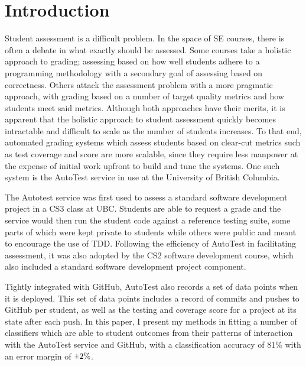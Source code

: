 \documentclass[sigchi]{acmart}
\newcommand{\rpm}{\sbox0{$1$}\sbox2{$\scriptstyle\pm$}
  \raise\dimexpr(\ht0-\ht2)/2\relax\box2 }
\begin{document}
\maketitle

\section{Introduction}
Student assessment is a difficult problem. In the space of SE courses, there is often a debate in what exactly should be assessed. Some courses take a holistic approach to grading; assessing based on how well students adhere to a programming methodology \cite{Felleisen:2001:DPI:369273} with a secondary goal of assessing based on correctness. Others attack the assessment problem with a more pragmatic approach, with grading based on a number of target quality metrics and how students meet said metrics. Although both approaches have their merits, it is apparent that the holistic approach to student assessment quickly becomes intractable and difficult to scale as the number of students increases. To that end, automated grading systems which assess students based on clear-cut metrics such as test coverage and score are more scalable, since they require less manpower at the expense of initial work upfront to build and tune the systems. One such system is the AutoTest\cite{AutoTest} service in use at the University of British Columbia.
\par The Autotest service was first used to assess a standard software development project in a CS3 class at UBC. Students are able to request a grade and the service would then run the student code against a reference testing suite, some parts of which were kept private to students while others were public and meant to encourage the use of TDD. Following the efficiency of AutoTest in facilitating assessment, it was also adopted by the CS2 software development course, which also included a standard software development project component.
\par Tightly integrated with GitHub, AutoTest also records a set of data points when it is deployed. This set of data points includes a record of commits and pushes to GitHub per student, as well as the testing and coverage score for a project at its state after each push. In this paper, I present my methods in fitting a number of classifiers which are able to student outcomes from their patterns of interaction with the AutoTest service and GitHub, with a classification accuracy of 81\% with an error margin of $\rpm 2\%$.
\end{document}
